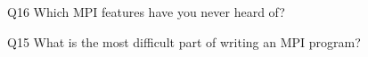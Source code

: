 \begin{description}%
\item{Q16} Which MPI features have you never heard of?%
\item{Q15} What is the most difficult part of writing an MPI program?%
\end{description}%
